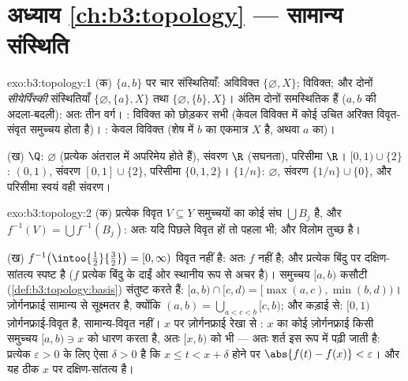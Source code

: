 \section*{अध्याय \ref{ch:b3:topology} --- सामान्य संस्थिति}

\begin{solution}{exo:b3:topology:1}
(क) $\{a,b\}$ पर चार संस्थितियाँ: अविविक्त $\{\varnothing, X\}$; विविक्त; और दोनों
\emph{सीयेर्पिंस्की} संस्थितियाँ $\{\varnothing, \{a\}, X\}$ तथा $\{\varnothing,
\{b\}, X\}$। अंतिम दोनों समस्थितिक
हैं ($a, b$ की अदला-बदली): अतः तीन वर्ग। : विविक्त को छोड़कर सभी
(केवल विविक्त  में कोई उचित अरिक्त विवृत-संवृत समुच्चय होता
है)। : केवल विविक्त (शेष में $b$ का एकमात्र  $X$
है, अथवा $a$ का)।

(ख) $\Q$:  $\varnothing$ (प्रत्येक अंतराल में अपरिमेय होते हैं), संवरण
$\R$ (सघनता), परिसीमा $\R$। $[0,1)
\cup \{2\}$:  $(0,1)$, संवरण $[0,1]\cup\{2\}$, परिसीमा
$\{0, 1, 2\}$। $\{1/n\}$:  $\varnothing$, संवरण $\{1/n\}\cup\{0\}$, और परिसीमा स्वयं वही संवरण।
\end{solution}

\begin{solution}{exo:b3:topology:2}
(क) प्रत्येक विवृत $V \subseteq Y$  समुच्चयों का कोई संघ $\bigcup B_j$ है, और $f^{-1}(V) = \bigcup f^{-1}(B_j)$:
अतः यदि पिछले विवृत हों तो पहला भी; और विलोम तुच्छ है।

(ख) $f^{-1}\bigl(\intoo{\frac12}{\frac32}\bigr) = [0, \infty)$ विवृत नहीं है: अतः $f$  नहीं है; और प्रत्येक बिंदु
पर दक्षिण-सांतत्य स्पष्ट है ($f$ प्रत्येक बिंदु के दाईं ओर स्थानीय
रूप से अचर है)। समुच्चय $[a, b)$  कसौटी (\cref{def:b3:topology:basis}) संतुष्ट करते हैं:
$[a,b)\cap[c,d) = [\max(a,c),
\min(b,d))$। ज़ोर्गनफ्राई  सामान्य  से सूक्ष्मतर है, क्योंकि
$(a, b) = \bigcup_{a < c < b}[c, b)$; और कड़ाई से: $[0,1)$ ज़ोर्गनफ्राई-विवृत है, सामान्य-विवृत नहीं।
$x$ पर ज़ोर्गनफ्राई रेखा से : $x$ का कोई ज़ोर्गनफ्राई 
किसी  समुच्चय $[a, b) \ni x$ को धारण करता है, अतः $[x, b)$ को भी --- अतः
 शर्त इस रूप में पढ़ी जाती है: प्रत्येक $\varepsilon > 0$ के लिए ऐसा $\delta > 0$
है कि $x \leq t < x + \delta$ होने पर $\abs{f(t) - f(x)} < \varepsilon$। और यह ठीक $x$ पर दक्षिण-सांतत्य है।
\end{solution}


